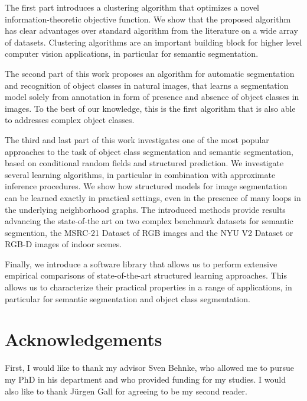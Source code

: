 \documentclass[12pt,toc=bibnumbered, a4paper,twoside,DIV=11,BCOR=.5cm]{scrbook}
\begin{document}
The first part introduces a clustering algorithm that optimizes a novel
information-theoretic objective function. We show that the proposed algorithm
has clear advantages over standard algorithm from the literature on a wide
array of datasets. Clustering algorithms are an important building block for
higher level computer vision applications, in particular for semantic
segmentation.

The second part of this work proposes an algorithm for automatic segmentation
and recognition of object classes in natural images, that learns a segmentation
model solely from annotation in form of presence and absence of object classes
in images. To the best of our knowledge, this is the first algorithm that is
also able to addresses complex object classes.

The third and last part of this work investigates one of the most popular
approaches to the task of object class segmentation and semantic segmentation,
based on conditional random fields and structured prediction.
%
%
We investigate several learning algorithms, in particular in combination with
approximate inference procedures. We show how structured models for image
segmentation can be learned exactly in practical settings, even in the presence
of many loops in the underlying neighborhood graphs.
The introduced methods provide results advancing the state-of-the art on two
complex benchmark datasets for semantic segmention, the MSRC-21 Dataset of RGB
images and the NYU V2 Dataset or RGB-D images of indoor scenes.

Finally, we introduce a software library that allows us to perform extensive empirical
comparisons of state-of-the-art structured learning approaches. This allows us
to characterize their practical properties in a range of applications, in
particular for semantic segmentation and object class segmentation.


\chapter*{Acknowledgements}
First, I would like to thank my advisor Sven Behnke, who allowed me
to pursue my PhD in his department and who provided funding for my studies.
I would also like to thank J\"urgen Gall for agreeing to be my second reader.
\end{document}
